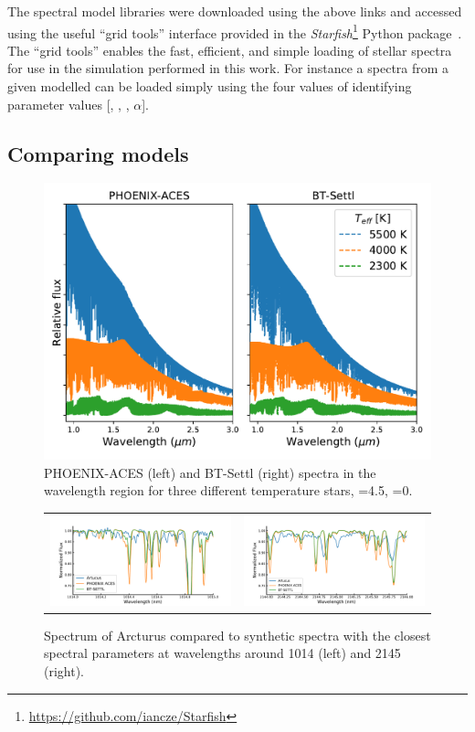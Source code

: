 The spectral model libraries were downloaded using the above links and accessed using the useful ``grid tools'' interface provided in the \emph{Starfish}\footnote{\url{https://github.com/iancze/Starfish}} Python package~\citep{czekala_constructing_2015}.
The ``grid tools'' enables the fast, efficient, and simple loading of stellar spectra for use in the simulation performed in this work.
For instance a spectra from a given modelled can be loaded simply using the four values of identifying parameter values [\txteff, \logg, \feh, $\alpha$].


\subsection{Comparing models}
\label{subsec:phoenix_comparision}
 \begin{figure}
    \centering
    \includegraphics[width=0.5\linewidth]{figures/atmos_and_models/phoenix_large_scale_comparision}
    \caption{{PHOENIX-ACES} (left) and {BT-Settl} (right) spectra in the \nir{} wavelength region for three different temperature stars, \logg{}=4.5, \feh{}=0.}
    \label{fig:phoenixlargescalecomparision}
\end{figure}

\begin{figure}
    \centering
    \begin{tabular}{cc}
        \includegraphics[width=0.48\linewidth]{figures/atmos_and_models/artucus_1micron} & \includegraphics[width=0.48\linewidth]{figures/atmos_and_models/artucus_2micron}\\
    \end{tabular}
    \caption{Spectrum of Arcturus compared to synthetic spectra with the closest spectral parameters at wavelengths around 1014\nm{} (left) and 2145\nm{} (right).}
    \label{fig:artucus1-2micron}
\end{figure}

